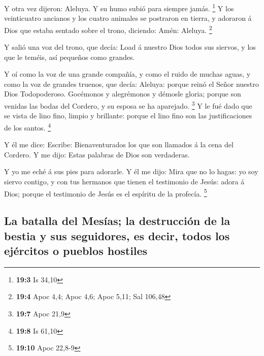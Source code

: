  Y otra vez dijeron: Aleluya. Y su humo subió para siempre
jamás. \footnote{\textbf{19:3} Is 34,10}  Y los veinticuatro
ancianos y los cuatro animales se postraron en tierra, y adoraron á Dios
que estaba sentado sobre el trono, diciendo: Amén: Aleluya. \footnote{\textbf{19:4}
  Apoc 4,4; Apoc 4,6; Apoc 5,11; Sal 106,48}

 Y salió una voz del trono, que decía: Load á nuestro Dios
todos sus siervos, y los que le teméis, así pequeños como grandes.

 Y oí como la voz de una grande compañía, y como el ruido de
muchas aguas, y como la voz de grandes truenos, que decía: Aleluya:
porque reinó el Señor nuestro Dios Todopoderoso.  Gocémonos
y alegrémonos y démosle gloria; porque son venidas las bodas del
Cordero, y su esposa se ha aparejado. \footnote{\textbf{19:7} Apoc 21,9}
 Y le fué dado que se vista de lino fino, limpio y
brillante: porque el lino fino son las justificaciones de los santos.
\footnote{\textbf{19:8} Is 61,10}

 Y él me dice: Escribe: Bienaventurados los que son llamados
á la cena del Cordero. Y me dijo: Estas palabras de Dios son verdaderas.

 Y yo me eché á sus pies para adorarle. Y él me dijo: Mira
que no lo hagas: yo soy siervo contigo, y con tus hermanos que tienen el
testimonio de Jesús: adora á Dios; porque el testimonio de Jesús es el
espíritu de la profecía. \footnote{\textbf{19:10} Apoc 22,8-9}

\hypertarget{la-batalla-del-mesuxedas-la-destrucciuxf3n-de-la-bestia-y-sus-seguidores-es-decir-todos-los-ejuxe9rcitos-o-pueblos-hostiles}{%
\subsection{La batalla del Mesías; la destrucción de la bestia y sus
seguidores, es decir, todos los ejércitos o pueblos
hostiles}\label{la-batalla-del-mesuxedas-la-destrucciuxf3n-de-la-bestia-y-sus-seguidores-es-decir-todos-los-ejuxe9rcitos-o-pueblos-hostiles}}


